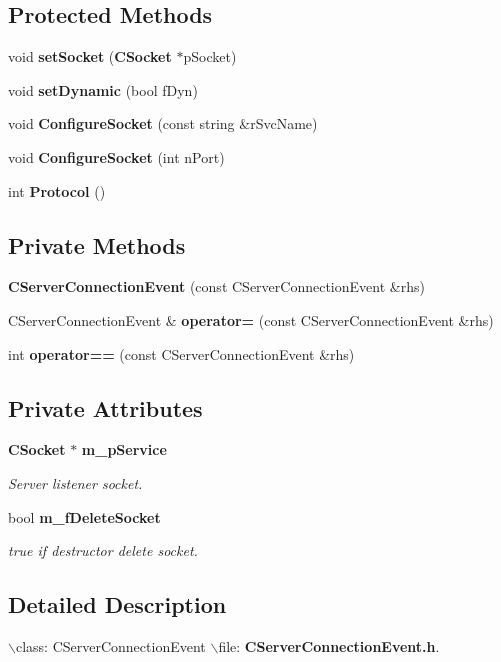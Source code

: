 \subsection*{Protected Methods}
\begin{CompactItemize}
\item 
void {\bf set\-Socket} ({\bf CSocket} $\ast$p\-Socket)
\item 
void {\bf set\-Dynamic} (bool f\-Dyn)
\item 
void {\bf Configure\-Socket} (const string \&r\-Svc\-Name)
\item 
void {\bf Configure\-Socket} (int n\-Port)
\item 
int {\bf Protocol} ()
\end{CompactItemize}
\subsection*{Private Methods}
\begin{CompactItemize}
\item 
{\bf CServer\-Connection\-Event} (const CServer\-Connection\-Event \&rhs)
\item 
CServer\-Connection\-Event \& {\bf operator=} (const CServer\-Connection\-Event \&rhs)
\item 
int {\bf operator==} (const CServer\-Connection\-Event \&rhs)
\end{CompactItemize}
\subsection*{Private Attributes}
\begin{CompactItemize}
\item 
{\bf CSocket} $\ast$ {\bf m\_\-p\-Service}
\begin{CompactList}\small\item\em Server listener socket.\item\end{CompactList}\item 
bool {\bf m\_\-f\-Delete\-Socket}
\begin{CompactList}\small\item\em true if destructor delete socket.\item\end{CompactList}\end{CompactItemize}


\subsection{Detailed Description}
$\backslash$class: CServer\-Connection\-Event $\backslash$file: {\bf CServer\-Connection\-Event.h}.

